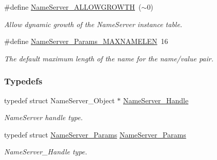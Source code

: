 \begin{DoxyCompactItemize}
\#define \hyperlink{_name_server_8h_aee02296103cd2e162143d40c917697d7}{Name\-Server\-\_\-\-A\-L\-L\-O\-W\-G\-R\-O\-W\-T\-H}~($\sim$0)
\begin{DoxyCompactList}\small\item\em Allow dynamic growth of the Name\-Server instance table. \end{DoxyCompactList}\item 
\#define \hyperlink{_name_server_8h_afa52c74cc2d67bda4d5522418abb4585}{Name\-Server\-\_\-\-Params\-\_\-\-M\-A\-X\-N\-A\-M\-E\-L\-E\-N}~16
\begin{DoxyCompactList}\small\item\em The default maximum length of the name for the name/value pair. \end{DoxyCompactList}\end{DoxyCompactItemize}
\subsubsection*{Typedefs}
\begin{DoxyCompactItemize}
\item 
typedef struct Name\-Server\-\_\-\-Object $\ast$ \hyperlink{_name_server_8h_a99fa93c4ee4169db90162b523d9152d4}{Name\-Server\-\_\-\-Handle}
\begin{DoxyCompactList}\small\item\em Name\-Server handle type. \end{DoxyCompactList}\item 
typedef struct \hyperlink{struct_name_server___params}{Name\-Server\-\_\-\-Params} \hyperlink{_name_server_8h_ad1c351b65dad7194f35c2ed9d7997b8d}{Name\-Server\-\_\-\-Params}
\begin{DoxyCompactList}\small\item\em Name\-Server\-\_\-\-Handle type. \end{DoxyCompactList}\end{DoxyCompactItemize}
